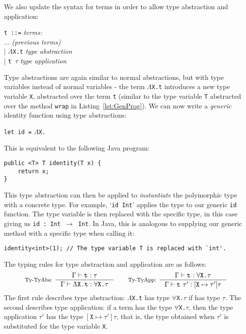 We also update the syntax for terms in order to allow type abstraction and application:
\begin{center}
\texttt{t ::=} 								\hfill \textit{terms:} \\
\hspace{2em} ... 							\hfill \textit{(previous terms)} \\
\hspace{2em} | $\Lambda$\texttt{X.t}		\hfill \textit{type abstraction} \\
\hspace{2em} | \texttt{t $\tau$}			\hfill \textit{type application}
\end{center}
Type abstractions are again similar to normal abstractions, but with type variables instead of normal variables - the term $\Lambda$\texttt{X.t} introduces a new type variable \texttt{X}, abstracted over the term \texttt{t} (similar to the type variable \texttt{T} abstracted over the method \texttt{wrap} in Listing~\ref{lst:GenProg}). We can now write a \textit{generic} identity function using type abstractions:
\begin{center}
\texttt{let id =} $\Lambda$\texttt{X.}
\end{center}
This is equivalent to the following Java program:
\begin{lstlisting}[label=lst:GenId,caption=Generic Identity Function in Java]
public <T> T identity(T x) {
	return x;
}
\end{lstlisting}
This type abstraction can then be applied to \textit{instantiate} the polymorphic type with a concrete type. For example, `\texttt{id Int}' applies the type \Intt{} to our generic \texttt{id} function. The type variable is then replaced with the specific type, in this case giving us \texttt{id : Int $\rightarrow$ Int}. In Java, this is analogous to supplying our generic method with a specific type when calling it:
\begin{lstlisting}[label=lst:GenIns,caption=Generic Identity Function in Java]
identity<int>(1); // The type variable T is replaced with `int'.
\end{lstlisting}

The typing rules for type abstraction and application are as follows:
\begin{align*}
\inference[Ty-TyAbs: ]{
  \Gamma \vdash \tm{t}{} : \tau
}{\Gamma \vdash \Lambda \texttt{X.}\tm{t}{} : \forall \texttt{X.}\tau}
\quad \quad
\inference[Ty-TyApp: ]{
  \Gamma \vdash \tm{t}{} : \forall \texttt{X.}\tau
}{\Gamma \vdash \tm{t}{}\ \tau' : [\texttt{X} \mapsto \tau']\tau}
\end{align*}
The first rule describes type abstraction: $\Lambda$\texttt{X.t} has type \texttt{$\forall$X.$\tau$} if  has type $\tau$. The second describes type application: if a term  has the type \texttt{$\forall$X.$\tau$}, then the type application  $\tau'$ has the type $[\texttt{X} \mapsto \tau']\tau$, that is, the type obtained when $\tau'$ is substituted for the type variable \texttt{X}.

